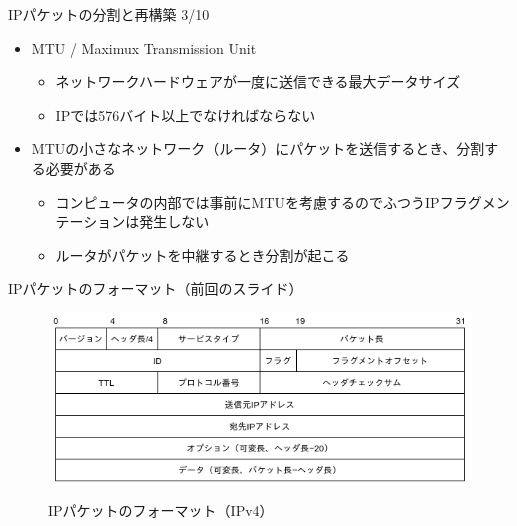 \documentclass[12pt,aspectratio=169]{beamer}
\begin{document}
\begin{frame}{IPパケットの分割と再構築 3/10}

  \begin{itemize}
    \item MTU / Maximux Transmission Unit
      \begin{itemize}
        \item ネットワークハードウェアが一度に送信できる最大データサイズ
        \item IPでは576バイト以上でなければならない
      \end{itemize}
    \item MTUの小さなネットワーク（ルータ）にパケットを送信するとき、分割する必要がある
      \begin{itemize}
        \item コンピュータの内部では事前にMTUを考慮するのでふつうIPフラグメンテーションは発生しない
        \item ルータがパケットを中継するとき分割が起こる
      \end{itemize}

  \end{itemize}

\end{frame}


\begin{frame}{IPパケットのフォーマット（前回のスライド）}

  \centering
  \begin{figure}
    \centering
    \includegraphics[width=12cm,bb=0 0 581 232]{../04/figures/ip_packet.png}
    \label{fig:ip_packet}
    \caption{IPパケットのフォーマット（IPv4）}
  \end{figure}

\end{frame}
\end{document}

